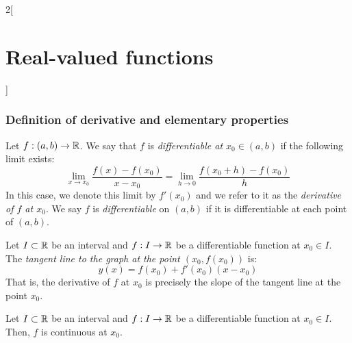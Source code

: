 \documentclass[../../../main_math.tex]{subfiles}
\begin{document}
\begin{multicols}{2}[\section{Real-valued functions}]
  \subsubsection{Definition of derivative and elementary properties}
  \begin{definition}
    Let $f:(a,b)\rightarrow\mathbb{R}$. We say that $f$ is \emph{differentiable at $x_0\in(a,b)$} if the following limit exists: $$\lim_{x\to x_0}\frac{f(x)-f(x_0)}{x-x_0}=\lim_{h\to 0}\frac{f(x_0+h)-f(x_0)}{h}$$
    In this case, we denote this limit by $f'(x_0)$ and we refer to it as the \emph{derivative of $f$ at $x_0$}. We say $f$ is \emph{differentiable} on $(a,b)$ if it is differentiable at each point of $(a,b)$.
  \end{definition}
  \begin{proposition}
    Let $I\subset\mathbb{R}$ be an interval and $f:I\rightarrow\mathbb{R}$ be a differentiable function at $x_0\in I$. The \emph{tangent line to the graph at the point $(x_0,f(x_0))$} is: $$y(x)=f(x_0)+f'(x_0)(x-x_0)$$ That is, the derivative of $f$ at $x_0$ is precisely the slope of the tangent line at the point $x_0$.
  \end{proposition}
  \begin{lemma}
    Let $I\subset\mathbb{R}$ be an interval and $f:I\rightarrow\mathbb{R}$ be a differentiable function at $x_0\in I$. Then, $f$ is continuous at $x_0$.
  \end{lemma}

\end{multicols}
\end{document}
